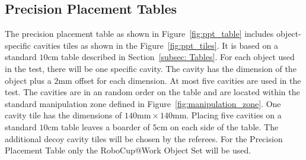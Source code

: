 \subsection{Precision Placement Tables}\label{sec:Precision Placement}

The precision placement table as shown in Figure~\ref{fig:ppt_table} includes object-specific cavities tiles as shown in the Figure~\ref{fig:ppt_tiles}. It is based on a standard $10\si{\centi\meter}$ table described in Section~\ref{subsec: Tables}. For each object used in the test, there will be one specific cavity. The cavity has the dimension of the object plus a $2 \si{\milli\meter}$ offset for each dimension. At most five cavities are used in the test. The cavities are in an random order on the table and are located within the standard manipulation zone defined in Figure~\ref{fig:manipulation_zone}. One cavity tile has the dimensions of $140 \si{\milli\meter} \times 140 \si{\milli\meter} $. Placing five cavities on a standard $10\si{\centi\meter}$ table leaves a boarder of $5 \si{\centi\meter}$ on each side of the table. The additional decoy cavity tiles will be chosen by the referees. For the Precision Placement Table only the RoboCup@Work Object Set will be used.
\clearpage

